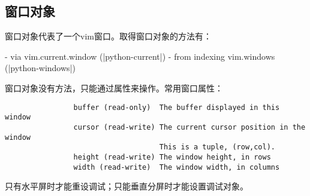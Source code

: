 		\subsection{窗口对象}

			窗口对象代表了一个vim窗口。取得窗口对象的方法有：

				- via vim.current.window (|python-current|)
				- from indexing vim.windows (|python-windows|)

			窗口对象没有方法，只能通过属性来操作。常用窗口属性：

			\begin{verbatim}
				buffer (read-only)  The buffer displayed in this window
				cursor (read-write) The current cursor position in the window
				                    This is a tuple, (row,col).
				height (read-write) The window height, in rows
				width (read-write)  The window width, in columns
			\end{verbatim}

			只有水平屏时才能重设调试；只能垂直分屏时才能设置调试对象。

